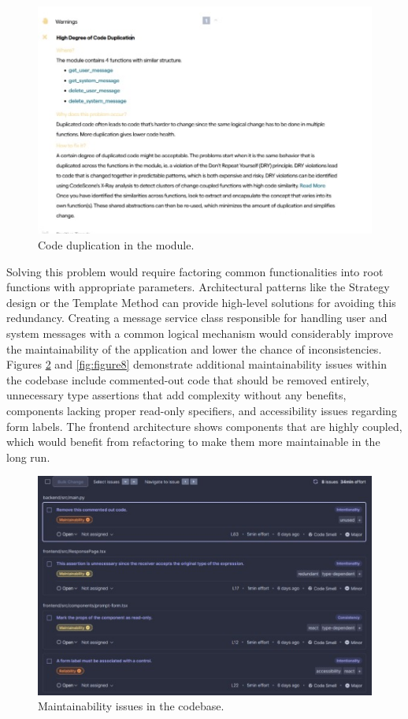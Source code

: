 \documentclass[sigconf]{acmart}
\begin{document}
\begin{figure}[htbp]
    \centering
    \includegraphics[width=1\linewidth]{Image7.jpg}
    \caption{Code duplication in the module.}
    \label{fig:figure6}
\end{figure}

Solving this problem would require factoring common functionalities into root functions with appropriate parameters. Architectural patterns like the Strategy design or the Template Method can provide high-level solutions for avoiding this redundancy. Creating a message service class responsible for handling user and system messages with a common logical mechanism would considerably improve the maintainability of the application and lower the chance of inconsistencies. Figures \ref{fig:figure7} and \ref{fig:figure8} demonstrate additional maintainability issues within the codebase include commented-out code that should be removed entirely, unnecessary type assertions that add complexity without any benefits, components lacking proper read-only specifiers, and accessibility issues regarding form labels. The frontend architecture shows components that are highly coupled, which would benefit from refactoring to make them more maintainable in the long run.

\begin{figure}[htbp]
    \centering
    \includegraphics[width=1\linewidth]{Image5.jpg}
    \caption{Maintainability issues in the codebase.}
    \label{fig:figure7}
\end{figure}
\end{document}
